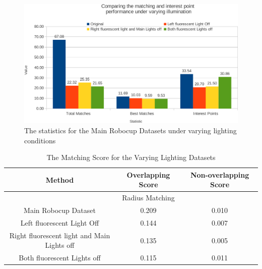 \documentclass[11pt]{report}
\begin{document}
\begin{figure}[h!] 
  \centering
    \includegraphics[width=1.0\textwidth]{../Drawings/Graphs/varyingLight_matches_keypoints_best.pdf}
    \caption{The statistics for the Main Robocup Datasets under varying lighting conditions}
    \label{fig:varyingLighting_matches_keypoints}
\end{figure}

\begin{table}
\caption{The Matching Score for the Varying Lighting Datasets}
\begin{tabular}{|c|c|c|}
\hline 
Method & Overlapping Score & Non-overlapping Score\tabularnewline
\hline 
\hline 
 & Radius Matching & \tabularnewline
\hline 
Main Robocup Dataset & 0.209 & 0.010\tabularnewline
\hline 
Left fluorescent Light Off & 0.144 & 0.007\tabularnewline
\hline 
Right fluorescent light and Main Lights off & 0.135 & 0.005\tabularnewline
\hline 
Both fluorescent Lights off & 0.115 & 0.011\tabularnewline
\hline 
\end{tabular}
\label{tab:lvMS}
\end{table}

\end{document}
